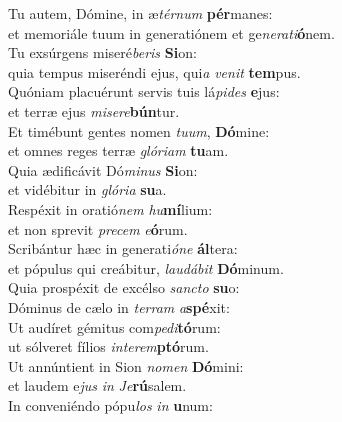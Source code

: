 \oddverse Tu autem, Dómine, in æ\textit{tér}\textit{num} \textbf{pér}manes:~\*\\
\oddverse et memoriále tuum in generatiónem et ge\textit{ne}\textit{ra}\textit{ti}\textbf{ó}nem.\\
\evenverse Tu exsúrgens miseré\textit{be}\textit{ris} \textbf{Si}on:~\*\\
\evenverse quia tempus miseréndi ejus, qui\textit{a} \textit{ve}\textit{nit} \textbf{tem}pus.\\
\oddverse Quóniam placuérunt servis tuis lá\textit{pi}\textit{des} \textbf{e}jus:~\*\\
\oddverse et terræ ejus \textit{mi}\textit{se}\textit{re}\textbf{bún}tur.\\
\evenverse Et timébunt gentes nomen \textit{tu}\textit{um}, \textbf{Dó}mine:~\*\\
\evenverse et omnes reges terræ \textit{gló}\textit{ri}\textit{am} \textbf{tu}am.\\
\oddverse Quia ædificávit Dó\textit{mi}\textit{nus} \textbf{Si}on:~\*\\
\oddverse et vidébitur in \textit{gló}\textit{ri}\textit{a} \textbf{su}a.\\
\evenverse Respéxit in oratió\textit{nem} \textit{hu}\textbf{mí}lium:~\*\\
\evenverse et non sprevit \textit{pre}\textit{cem} \textit{e}\textbf{ó}rum.\\
\oddverse Scribántur hæc in generati\textit{ó}\textit{ne} \textbf{ál}tera:~\*\\
\oddverse et pópulus qui creábitur, \textit{lau}\textit{dá}\textit{bit} \textbf{Dó}minum.\\
\evenverse Quia prospéxit de excélso \textit{san}\textit{cto} \textbf{su}o:~\*\\
\evenverse Dóminus de cælo in \textit{ter}\textit{ram} \textit{a}\textbf{spé}xit:\\
\oddverse Ut audíret gémitus com\textit{pe}\textit{di}\textbf{tó}rum:~\*\\
\oddverse ut sólveret fílios \textit{in}\textit{te}\textit{rem}\textbf{ptó}rum.\\
\evenverse Ut annúntient in Sion \textit{no}\textit{men} \textbf{Dó}mini:~\*\\
\evenverse et laudem e\textit{jus} \textit{in} \textit{Je}\textbf{rú}salem.\\
\oddverse In conveniéndo pópu\textit{los} \textit{in} \textbf{u}num:~\*\\
